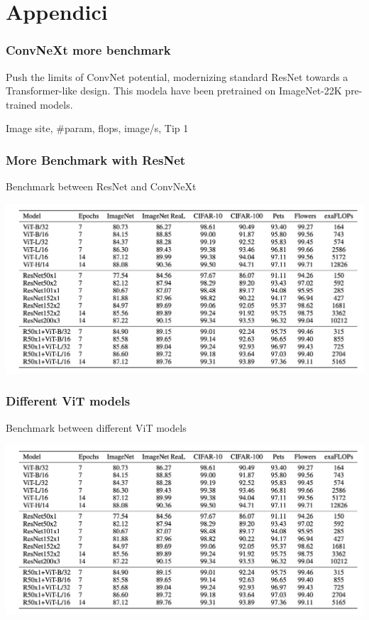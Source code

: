 \section{Appendici}

\begin{frame}
\frametitle{ConvNeXt more benchmark}
Push the limits of ConvNet potential, modernizing  standard ResNet towards a Transformer-like design.
This modela have been pretrained on ImageNet-22K pre-trained models.


Image site, #param, flops, image/s, Tip 1

\end{frame}


\begin{frame}
\frametitle{More Benchmark with ResNet}
Benchmark between ResNet and ConvNeXt
\begin{center}
    \includegraphics[width=1\textwidth]{img/4-section/More-benchmark.png}
\end{center}

\end{frame}

\begin{frame}
\frametitle{Different ViT models}
Benchmark between different ViT models
\begin{center}
    \includegraphics[width=1\textwidth]{img/4-section/More-benchmark.png}
\end{center}

\end{frame}


